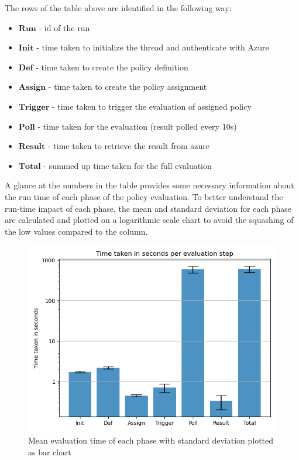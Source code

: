 The rows of the table above are identified in the following way:
\begin{itemize}
    \item $\boldsymbol{Run}$ - id of the run
    \item $\boldsymbol{Init}$ - time taken to initialize the thread and authenticate with Azure
    \item $\boldsymbol{Def}$ - time taken to create the policy definition
    \item $\boldsymbol{Assign}$ - time taken to create the policy assignment
    \item $\boldsymbol{Trigger}$ - time taken to trigger the evaluation of assigned policy
    \item $\boldsymbol{Poll}$ - time taken for the evaluation (result polled every 10s)
    \item $\boldsymbol{Result}$ - time taken to retrieve the result from azure
    \item $\boldsymbol{Total}$ - summed up time taken for the full evaluation
\end{itemize}

A glance at the numbers in the table provides some necessary information about the run time of each phase of the policy evaluation. To better understand the run-time impact of each phase, the mean and standard deviation for each phase are calculated and plotted on a logarithmic scale chart to avoid the squashing of the low values compared to the  column.

\begin{figure}[ht!]
\begin{center}
\includegraphics[width=15cm]{azure_evaluation_time.png}
\end{center}
\caption[Mean evaluation time of each phase with standard deviation plotted as bar chart]{Mean evaluation time of each phase with standard deviation plotted as bar chart}
\end{figure}

